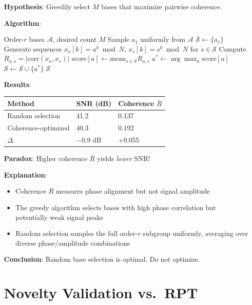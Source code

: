 \documentclass[10pt,twocolumn]{article}
\begin{document}
\textbf{Hypothesis}: Greedily select $M$ bases that maximize pairwise coherence.

\textbf{Algorithm}:
\begin{algorithm}[H]
\caption{Greedy Coherence Maximization}
\begin{algorithmic}[1]
\Require Order-$r$ bases $\mathcal{A}$, desired count $M$
\State Sample $a_1$ uniformly from $\mathcal{A}$
\State $\mathcal{S} \gets \{a_1\}$
        \State Generate sequences $x_a[k] = a^k \bmod N$, $x_s[k] = s^k \bmod N$ for $s \in \mathcal{S}$
        \State Compute $R_{a,s} = |\text{corr}(x_a, x_s)|$
        \State $\text{score}[a] \gets \text{mean}_{s \in \mathcal{S}} R_{a,s}$
    \EndFor
    \State $a^* \gets \arg\max_a \text{score}[a]$
    \State $\mathcal{S} \gets \mathcal{S} \cup \{a^*\}$
\EndFor
\State \Return $\mathcal{S}$
\end{algorithmic}
\end{algorithm}

\textbf{Results}:
\begin{center}
\begin{tabular}{lll}
\toprule
Method & SNR (dB) & Coherence $\bar{R}$ \\
\midrule
Random selection & 41.2 & 0.137 \\
Coherence-optimized & 40.3 & 0.192 \\
$\Delta$ & $-$0.9 dB & +0.055 \\
\bottomrule
\end{tabular}
\end{center}

\textbf{Paradox}: Higher coherence $\bar{R}$ yields \emph{lower} SNR!

\textbf{Explanation}:
\begin{itemize}
\item Coherence $\bar{R}$ measures phase alignment but not signal amplitude
\item The greedy algorithm selects bases with high phase correlation but potentially weak signal peaks
\item Random selection samples the full order-$r$ subgroup uniformly, averaging over diverse phase/amplitude combinations
\end{itemize}

\textbf{Conclusion}: Random base selection is optimal. Do not optimize.

\section{Novelty Validation vs.\ RPT}
\label{sec:novelty}
\end{document}
